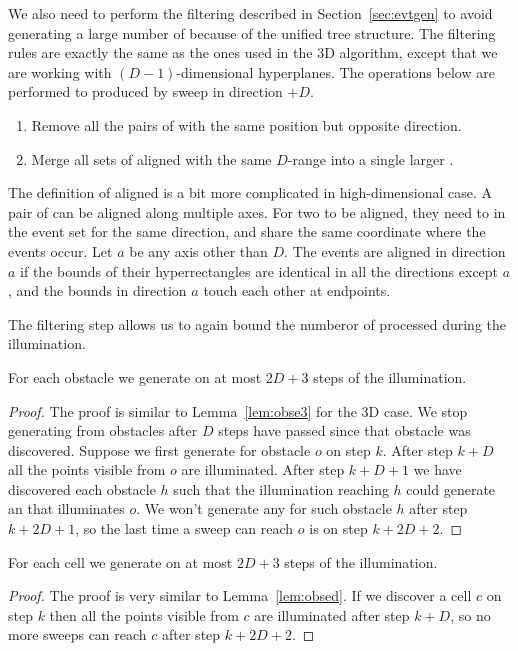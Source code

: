 \documentclass[english,gradu]{tktltiki2018}
\begin{document}
We also need to perform the filtering described in Section~\ref{sec:evtgen} to avoid generating a large number of \addEs because of the unified tree structure.
The filtering rules are exactly the same as the ones used in the 3D algorithm, except that we are working with $(D-1)$-dimensional hyperplanes.
The operations below are performed to \addEs produced by sweep in direction $+D$.
\begin{enumerate}
\item Remove all the pairs of \addEs with the same position but opposite direction.
\item Merge all sets of aligned \addEs with the same $D$-range into a single larger \addE.
\end{enumerate}

The definition of aligned \addEs is a bit more complicated in high-dimensional case.
A pair of \addEs can be aligned along multiple axes.
For two \addEs to be aligned, they need to in the event set for the same direction, and share the same coordinate where the events occur.
Let $a$ be any axis other than $D$.
The events are aligned in direction $a$ if the bounds of their hyperrectangles are identical in all the directions except $a$, and the bounds in direction $a$ touch each other at endpoints.

The filtering step allows us to again bound the numberor of \addEs processed during the illumination.

\begin{lem}\label{lem:obsed}For each obstacle we generate \obsE on at most $2D+3$ steps of the illumination.\end{lem}
\begin{proof}
The proof is similar to Lemma~\ref{lem:obse3} for the 3D case.
We stop generating \addEs from obstacles after $D$ steps have passed since that obstacle was discovered.
Suppose we first generate \obsE for obstacle $o$ on step $k$.
After step $k+D$ all the points visible from $o$ are illuminated.
After step $k+D+1$ we have discovered each obstacle $h$ such that the illumination reaching $h$ could generate an \addE that illuminates $o$.
We won't generate any \addEs for such obstacle $h$ after step $k+2D+1$, so the last time a sweep can reach $o$ is on step $k+2D+2$.
\end{proof}

\begin{lem}\label{lem:celled}For each cell we generate \cellE on at most $2D+3$ steps of the illumination.\end{lem}
\begin{proof}
The proof is very similar to Lemma~\ref{lem:obsed}.
If we discover a cell $c$ on step $k$ then all the points visible from $c$ are illuminated after step $k+D$, so no more sweeps can reach $c$ after step $k+2D+2$.
\end{proof}
\end{document}

